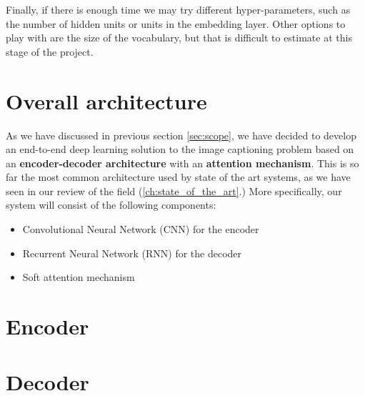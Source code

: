 Finally, if there is enough time we may try different hyper-parameters, such as the number of hidden units or units in the embedding layer. Other options to play with are the size of the vocabulary, but that is difficult to estimate at this stage of the project.


\section{Overall architecture}

As we have discussed in previous section \cref{sec:scope}, we have decided to develop an end-to-end deep learning solution to the image captioning problem based on an \textbf{encoder-decoder architecture} with an \textbf{attention mechanism}. This is so far the most common architecture used by state of the art systems, as we have seen in our review of the field (\cref{ch:state_of_the_art}.)
More specifically, our system will consist of the following components:

\begin{itemize}
    \item Convolutional Neural Network (CNN) for the encoder
    \item Recurrent Neural Network (RNN) for the decoder
    \item Soft attention mechanism
\end{itemize}


\section{Encoder}

\section{Decoder}














